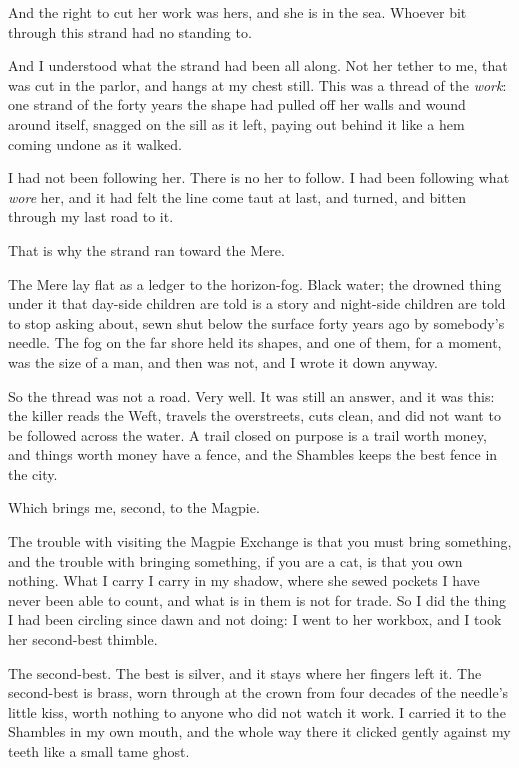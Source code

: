 And the right to cut her work was hers, and she is in the sea. Whoever bit through this strand had no standing to.

And I understood what the strand had been all along. Not her tether to me, that was cut in the parlor, and hangs at my chest still. This was a thread of the \emph{work}: one strand of the forty years the shape had pulled off her walls and wound around itself, snagged on the sill as it left, paying out behind it like a hem coming undone as it walked.

I had not been following her. There is no her to follow. I had been following what \emph{wore} her, and it had felt the line come taut at last, and turned, and bitten through my last road to it.

That is why the strand ran toward the Mere.

The Mere lay flat as a ledger to the horizon-fog. Black water; the drowned thing under it that day-side children are told is a story and night-side children are told to stop asking about, sewn shut below the surface forty years ago by somebody's needle. The fog on the far shore held its shapes, and one of them, for a moment, was the size of a man, and then was not, and I wrote it down anyway.

So the thread was not a road. Very well. It was still an answer, and it was this: the killer reads the Weft, travels the overstreets, cuts clean, and did not want to be followed across the water. A trail closed on purpose is a trail worth money, and things worth money have a fence, and the Shambles keeps the best fence in the city.

Which brings me, second, to the Magpie.

\scenebreak

The trouble with visiting the Magpie Exchange is that you must bring something, and the trouble with bringing something, if you are a cat, is that you own nothing. What I carry I carry in my shadow, where she sewed pockets I have never been able to count, and what is in them is not for trade. So I did the thing I had been circling since dawn and not doing: I went to her workbox, and I took her second-best thimble.

The second-best. The best is silver, and it stays where her fingers left it. The second-best is brass, worn through at the crown from four decades of the needle's little kiss, worth nothing to anyone who did not watch it work. I carried it to the Shambles in my own mouth, and the whole way there it clicked gently against my teeth like a small tame ghost.

